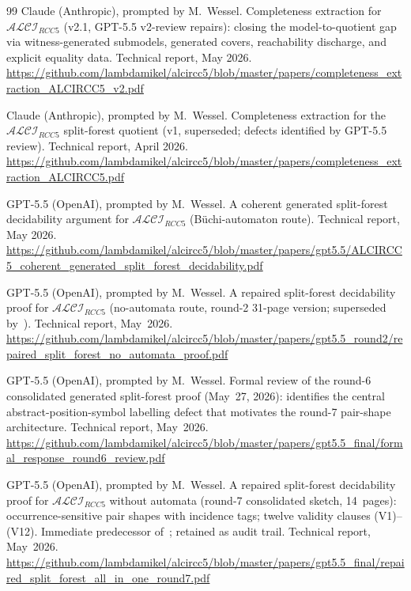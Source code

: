 \documentclass[
]{ceurart}
\theoremstyle{definition}
\newcommand{\ALCIRCC}[1]{\ensuremath{\mathcal{ALCI}_{\mathit{RCC#1}}}}
\begin{document}
\begin{thebibliography}{99}
Claude (Anthropic), prompted by M.\ Wessel.
\newblock Completeness extraction for $\ALCIRCC{5}$ (v2.1,
  GPT-5.5 v2-review repairs): closing the model-to-quotient gap via
  witness-generated submodels, generated covers, reachability
  discharge, and explicit equality data.
\newblock Technical report, May 2026.
\newblock \url{https://github.com/lambdamikel/alcircc5/blob/master/papers/completeness_extraction_ALCIRCC5_v2.pdf}

Claude (Anthropic), prompted by M.\ Wessel.
\newblock Completeness extraction for the $\ALCIRCC{5}$ split-forest
  quotient (v1, superseded; defects identified by GPT-5.5 review).
\newblock Technical report, April 2026.
\newblock \url{https://github.com/lambdamikel/alcircc5/blob/master/papers/completeness_extraction_ALCIRCC5.pdf}

GPT-5.5 (OpenAI), prompted by M.\ Wessel.
\newblock A coherent generated split-forest decidability argument
  for $\ALCIRCC{5}$ (B\"uchi-automaton route).
\newblock Technical report, May 2026.
\newblock \url{https://github.com/lambdamikel/alcircc5/blob/master/papers/gpt5.5/ALCIRCC5_coherent_generated_split_forest_decidability.pdf}

GPT-5.5 (OpenAI), prompted by M.\ Wessel.
\newblock A repaired split-forest decidability proof for
  $\ALCIRCC{5}$ (no-automata route, round-2 31-page version;
  superseded by~\cite{GPT55Round7Sketch}).
\newblock Technical report, May~2026.
\newblock \url{https://github.com/lambdamikel/alcircc5/blob/master/papers/gpt5.5_round2/repaired_split_forest_no_automata_proof.pdf}

GPT-5.5 (OpenAI), prompted by M.\ Wessel.
\newblock Formal review of the round-6 consolidated generated
  split-forest proof (May~27, 2026): identifies the central
  abstract-position-symbol labelling defect that motivates the
  round-7 pair-shape architecture.
\newblock Technical report, May~2026.
\newblock \url{https://github.com/lambdamikel/alcircc5/blob/master/papers/gpt5.5_final/formal_response_round6_review.pdf}

GPT-5.5 (OpenAI), prompted by M.\ Wessel.
\newblock A repaired split-forest decidability proof for
  $\ALCIRCC{5}$ without automata (round-7 consolidated sketch,
  14~pages): occurrence-sensitive pair shapes with incidence
  tags; twelve validity clauses (V1)--(V12).  Immediate
  predecessor of~\cite{GPT55Round8Sketch}; retained as audit trail.
\newblock Technical report, May~2026.
\newblock \url{https://github.com/lambdamikel/alcircc5/blob/master/papers/gpt5.5_final/repaired_split_forest_all_in_one_round7.pdf}


\end{thebibliography}
\end{document}
